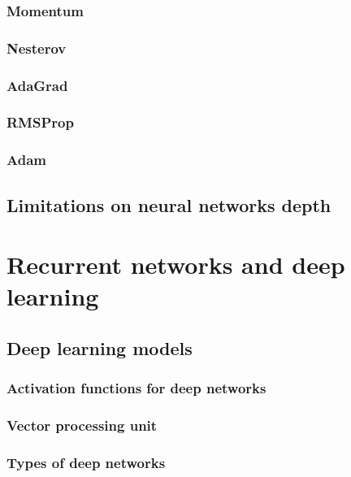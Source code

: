 \subsubsection{Momentum}
\subsubsection{Nesterov}
\subsubsection{AdaGrad}
\subsubsection{RMSProp}
\subsubsection{Adam}

\subsection{Limitations on neural networks depth}


\section{Recurrent networks and deep learning}

\subsection{Deep learning models}
\subsubsection{Activation functions for deep networks}
\subsubsection{Vector processing unit}
\subsubsection{Types of deep networks}

